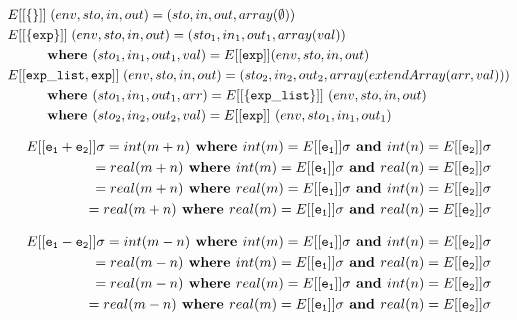 \documentclass[12pt]{article}
\begin{document}
\begin{align*}
&E[[{\tt \{\}}]] \;(env,sto,in,out) = (sto,in,out,array(\emptyset)) \\
&E[[{\tt \{exp\}}]] \;(env,sto,in,out) = (sto_1, in_1, out_1, array(val)) \\
&\hspace{6ex}\textbf{ where } (sto_1, in_1, out_1, val) = E[[{\tt exp}]] (env,sto,in,out) \\
&E[[{\tt exp\_list, exp}]] \;(env,sto,in,out) = (sto_2, in_2, out_2, array(extendArray(arr, val))) \\
&\hspace{6ex}\textbf{ where } (sto_1, in_1, out_1, arr) = E[[{\tt\{ exp\_list\}}]]\ (env, sto, in, out) \\
&\hspace{6ex}\textbf{ where } (sto_2, in_2, out_2, val) = E[[{\tt exp}]]\ (env, sto_1, in_1, out_1) \\
\end{align*}

\begin{align*}
E[[{\tt e_1 + e_2}]] \sigma = int(m + n) \textbf{ where } int(m) = E[[{\tt e_1}]] \sigma \textbf{ and } int(n) = E[[{\tt e_2}]] \sigma \\
                            = real(m + n) \textbf{ where } int(m) = E[[{\tt e_1}]] \sigma \textbf{ and } real(n) = E[[{\tt e_2}]] \sigma \\
                   = real(m + n) \textbf{ where } real(m) = E[[{\tt e_1}]] \sigma \textbf{ and } int(n) = E[[{\tt e_2}]] \sigma \\
                   = real(m + n) \textbf{ where } real(m) = E[[{\tt e_1}]] \sigma \textbf{ and } real(n) = E[[{\tt e_2}]] \sigma \\
\end{align*}

\begin{align*}
E[[{\tt e_1 - e_2}]] \sigma = int(m - n) \textbf{ where } int(m) = E[[{\tt e_1}]] \sigma \textbf{ and } int(n) = E[[{\tt e_2}]] \sigma \\
                            = real(m - n) \textbf{ where } int(m) = E[[{\tt e_1}]] \sigma \textbf{ and } real(n) = E[[{\tt e_2}]] \sigma \\
                   = real(m - n) \textbf{ where } real(m) = E[[{\tt e_1}]] \sigma \textbf{ and } int(n) = E[[{\tt e_2}]] \sigma \\
                   = real(m - n) \textbf{ where } real(m) = E[[{\tt e_1}]] \sigma \textbf{ and } real(n) = E[[{\tt e_2}]] \sigma \\
\end{align*}
\end{document}
